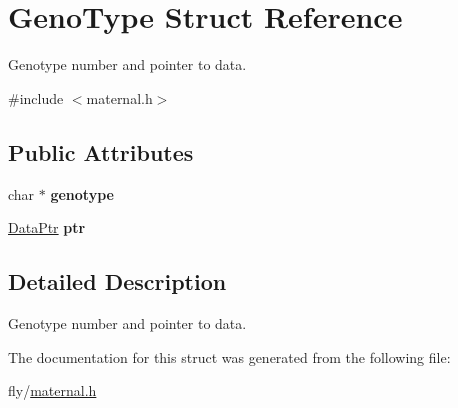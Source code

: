 \hypertarget{structGenoType}{
\section{GenoType Struct Reference}
\label{structGenoType}
}


Genotype number and pointer to data.  


{\ttfamily \#include $<$maternal.h$>$}\subsection*{Public Attributes}
\begin{DoxyCompactItemize}
\item 
\hypertarget{structGenoType_aafc7fb5facfe79e03ccc03ee33a1f126}{
char $\ast$ {\bfseries genotype}}
\label{structGenoType_aafc7fb5facfe79e03ccc03ee33a1f126}

\item 
\hypertarget{structGenoType_a2aea3c95eaaf55424e294659535fff79}{
\hyperlink{unionDataPtr}{DataPtr} {\bfseries ptr}}
\label{structGenoType_a2aea3c95eaaf55424e294659535fff79}

\end{DoxyCompactItemize}


\subsection{Detailed Description}
Genotype number and pointer to data. 

The documentation for this struct was generated from the following file:\begin{DoxyCompactItemize}
\item 
fly/\hyperlink{maternal_8h}{maternal.h}\end{DoxyCompactItemize}
